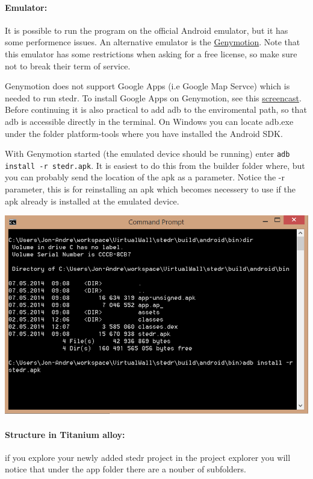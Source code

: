 \paragraph{Emulator:}
It is possible to run the program on the official Android emulator, but it has some performence issues. An alternative emulator is the \href{https://shop.genymotion.com/index.php?controller=order-opc}{Genymotion}. Note that this emulator has some restrictions when asking for a free license, so make sure not to break their term of service. 

Genymotion does not support Google Apps (i.e Google Map Servce) which is needed to run stedr. To install Google Apps on Genymotion, see this \href{https://www.youtube.com/watch?v=iCRNqCXGNK0}{screencast}. Before continuing it is also practical to add adb to the enviromental path, so that adb is accessible directly in the terminal. On Windows you can locate adb.exe under the folder platform-tools where you have installed the Android SDK. 

With Genymotion started (the emulated device should be running) enter \texttt{adb install -r stedr.apk}. It is easiest to do this from the builder folder where, but you can probably send the location of the apk as a parameter. Notice the -r parameter, this is for reinstalling an apk which becomes necessery to use if the apk already is installed at the emulated device.

\begin{center}
\includegraphics[scale=0.7]{guide/f45.png} 
\end{center}

\paragraph{Structure in Titanium alloy:}
if you explore your newly added stedr project in the project explorer you will notice that under the app folder there are a nouber of subfolders.

